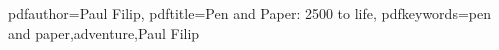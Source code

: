 \newcommand{\adventurename}{2500 to life}	%
\newcommand{\mainauthor}{Paul Filip}								%
\newcommand{\coauthor}{}								%

\newcommand{\ruleset}{How to be a hero}					%
\newcommand{\ruleseturl}{www.howtobeahero.de}		%

\newcommand{\place}{ISV New Horizons}											%
\newcommand{\storytime}{2500 n. Chr.}							%
\newcommand{\playercount}{3 bis 4}					%
\newcommand{\difficulty}{Medium}						%
\newcommand{\duration}{TBD}								%

\newcommand{\quotelength}{11}										%
\newcommand{\quoteauthor}{Craig Reucassel}								%
\newcommand{\quotetext}{												%
\textbf{Geez, all that money we waste on space exploration. Just think how many bombs that would buy!}
}



\hypersetup
{
	pdfauthor={\mainauthor},
	pdftitle={Pen and Paper: \adventurename},
	pdfkeywords={pen and paper,adventure,\mainauthor}
}
